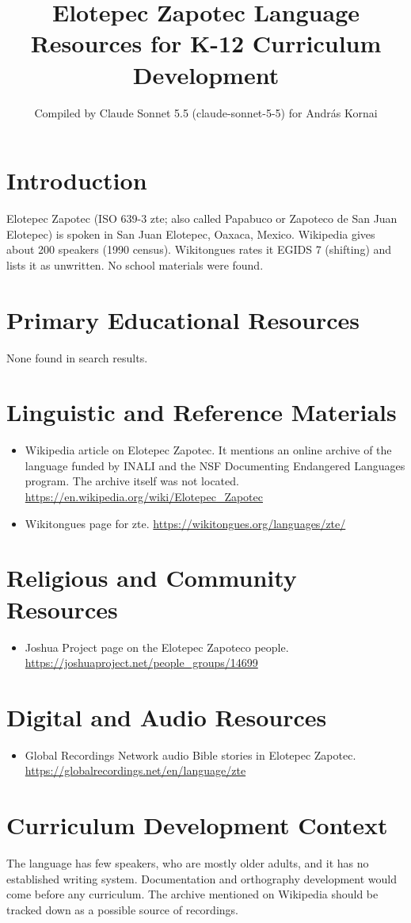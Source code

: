 \documentclass[12pt]{article}
\title{Elotepec Zapotec Language Resources for K-12 Curriculum Development}
\author{Compiled by Claude Sonnet 5.5 (claude-sonnet-5-5) for Andr\'as Kornai}
\date{}
\begin{document}
\maketitle

\section{Introduction}
Elotepec Zapotec (ISO 639-3 zte; also called Papabuco or Zapoteco de San Juan Elotepec) is spoken in San Juan Elotepec, Oaxaca, Mexico. Wikipedia gives about 200 speakers (1990 census). Wikitongues rates it EGIDS 7 (shifting) and lists it as unwritten. No school materials were found.

\section{Primary Educational Resources}
None found in search results.

\section{Linguistic and Reference Materials}
\begin{itemize}
\item Wikipedia article on Elotepec Zapotec. It mentions an online archive of the language funded by INALI and the NSF Documenting Endangered Languages program. The archive itself was not located. \url{https://en.wikipedia.org/wiki/Elotepec_Zapotec}
\item Wikitongues page for zte. \url{https://wikitongues.org/languages/zte/}
\end{itemize}

\section{Religious and Community Resources}
\begin{itemize}
\item Joshua Project page on the Elotepec Zapoteco people. \url{https://joshuaproject.net/people_groups/14699}
\end{itemize}

\section{Digital and Audio Resources}
\begin{itemize}
\item Global Recordings Network audio Bible stories in Elotepec Zapotec. \url{https://globalrecordings.net/en/language/zte}
\end{itemize}

\section{Curriculum Development Context}
The language has few speakers, who are mostly older adults, and it has no established writing system. Documentation and orthography development would come before any curriculum. The archive mentioned on Wikipedia should be tracked down as a possible source of recordings.
\end{document}
